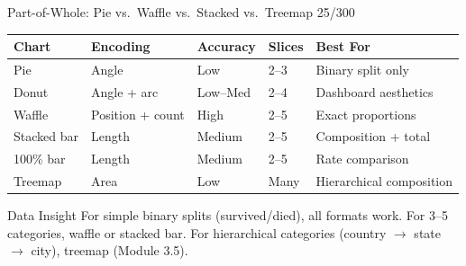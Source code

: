 \documentclass[10pt]{beamer}
\newcommand{\smark}[1]{\hfill{\scriptsize\color{codegray}#1}}
\begin{document}
\begin{frame}{Part-of-Whole: Pie vs.\ Waffle vs.\ Stacked vs.\ Treemap}
\smark{25/300}
\centering\small
\begin{tabular}{@{}lllll@{}}
    \toprule
    \textbf{Chart} & \textbf{Encoding} & \textbf{Accuracy} & \textbf{Slices} & \textbf{Best For} \\
    \midrule
    Pie        & Angle         & Low        & 2--3    & Binary split only \\
    Donut      & Angle + arc   & Low--Med   & 2--4    & Dashboard aesthetics \\
    Waffle     & Position + count & High    & 2--5    & Exact proportions \\
    Stacked bar& Length        & Medium     & 2--5    & Composition + total \\
    100\% bar  & Length        & Medium     & 2--5    & Rate comparison \\
    Treemap    & Area          & Low        & Many    & Hierarchical composition \\
    \bottomrule
\end{tabular}

\vspace{0.3cm}
\begin{exampleblock}{Data Insight}
    \scriptsize For simple binary splits (survived/died), all formats work. For 3--5 categories, waffle or stacked bar. For hierarchical categories (country $\to$ state $\to$ city), treemap (Module 3.5).
\end{exampleblock}
\end{frame}
\end{document}
